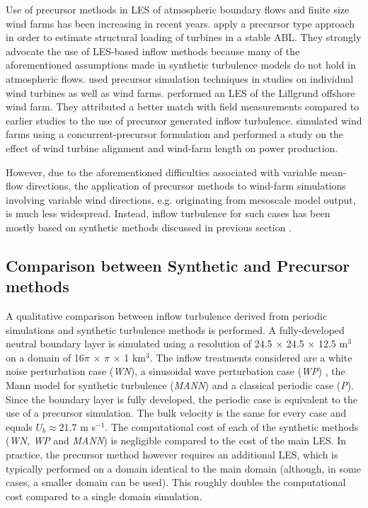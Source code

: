 	Use of precursor methods  in LES of atmospheric boundary flows and finite size wind farms has been increasing in recent years. \cite{park2014large} apply a precursor type approach in order to estimate structural loading of turbines in a stable ABL. They strongly advocate the use of LES-based inflow methods because many of the aforementioned assumptions made in synthetic turbulence models do not hold in atmospheric flows.
	\cite{wu2011large, wu2012atmospheric, wu2013simulation,  wu2015modeling} used precursor simulation techniques in studies on individual wind turbines as well as wind farms.
	\cite{churchfield2012large} performed an LES of the Lillgrund offshore wind farm. They attributed a better match with field measurements compared to earlier studies to the use of precursor generated inflow turbulence. \cite{stevens2014large, stevens2014concurrent} simulated wind farms using a concurrent-precursor formulation and performed a study on the effect of wind turbine alignment and wind-farm length on power production.  
	
	However, due to the aforementioned difficulties associated with variable mean-flow directions, the application of precursor methods to wind-farm simulations involving variable wind directions, e.g. originating from mesoscale model output, is much less widespread. Instead, inflow turbulence for such cases has been mostly based on synthetic methods discussed in previous section \citep{mirocha2013transition, mirocha2014resolved, munoz2015stochastic}.
	
	
	\subsection{Comparison between Synthetic and Precursor methods}\label{subsec:comparison}
	A qualitative comparison between inflow turbulence derived from periodic simulations and synthetic turbulence methods is performed. A fully-developed neutral boundary layer is simulated using a resolution of 24.5 $\times$ 24.5 $\times$ 12.5 m$^3$ on a domain of 16$\pi$ $\times$ $\pi$ $\times$ 1 km$^3$. The inflow treatments considered are a white noise perturbation case  (\emph{WN}), a sinusoidal wave perturbation case (\emph{WP}) , the Mann model for synthetic turbulence (\emph{MANN}) and a classical periodic case (\emph{P}). Since the boundary layer is fully developed, the periodic case is equivalent to the use of a precursor simulation. The bulk velocity is the same for every case and equals $U_b \approx 21.7 $ m s$^{-1}$. The computational cost of each of the synthetic methods (\emph{WN, WP} and \emph{MANN}) is negligible compared to the cost of the main LES. In practice, the precursor method however requires an additional LES, which is typically performed on a domain identical to the main domain (although, in some cases, a smaller domain can be used). This roughly doubles the computational cost compared to a single domain simulation.
	
